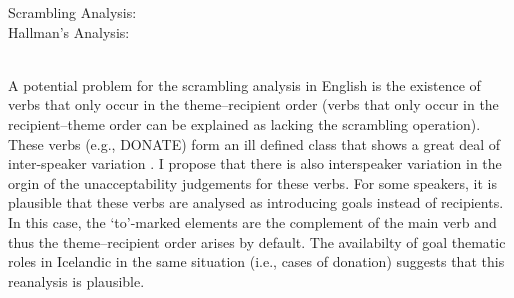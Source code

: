 \begin{exe}
\ex \label{ex:comparison-trees}
\begin{xlist}
\ex Scrambling Analysis: \\
 \ex\label{ex:hallman-tree} Hallman's Analysis: \\
\\
\end{xlist}
\end{exe}%

A potential problem for the scrambling analysis in English is the existence of verbs that only occur in the theme--recipient order (verbs that only occur in the recipient--theme order can be explained as lacking the scrambling operation). These verbs (e.g., DONATE) form an ill defined class that shows a great deal of inter-speaker variation \citep{Levin.1993}. I propose that there is also interspeaker variation in the orgin of the unacceptability judgements for these verbs. For some speakers, it is plausible that these verbs are analysed as introducing goals instead of recipients. In this case, the `to'-marked elements are the complement of the main verb and thus the theme--recipient order arises by default. The availabilty of goal thematic roles in Icelandic in the same situation (i.e., cases of donation) suggests that this reanalysis is plausible.

